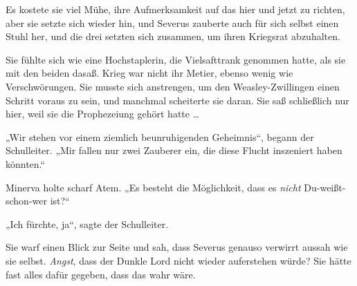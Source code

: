 Es kostete sie viel Mühe, ihre Aufmerksamkeit auf das hier und jetzt zu richten, aber sie setzte sich wieder hin, und Severus zauberte auch für sich selbst einen Stuhl her, und die drei setzten sich zusammen, um ihren Kriegsrat abzuhalten.

Sie fühlte sich wie eine Hochstaplerin, die Vielsafttrank genommen hatte, als sie mit den beiden dasaß. Krieg war nicht ihr Metier, ebenso wenig wie Verschwörungen. Sie musste sich anstrengen, um den Weasley-Zwillingen einen Schritt voraus zu sein, und manchmal scheiterte sie daran. Sie saß schließlich nur hier, weil sie die Prophezeiung gehört hatte …

„Wir stehen vor einem ziemlich beunruhigenden Geheimnis“, begann der Schulleiter.
„Mir fallen nur zwei Zauberer ein, die diese Flucht inszeniert haben könnten.“

Minerva holte scharf Atem.
„Es besteht die Möglichkeit, dass es \emph{nicht} Du-weißt-schon-wer ist?“

„Ich fürchte, ja“, sagte der Schulleiter.

Sie warf einen Blick zur Seite und sah, dass Severus genauso verwirrt aussah wie sie selbst. \emph{Angst}, dass der Dunkle Lord nicht wieder auferstehen würde? Sie hätte fast alles dafür gegeben, dass das wahr wäre.

